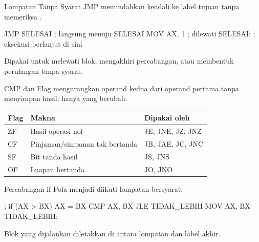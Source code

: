\documentclass[aspectratio=169,11pt]{beamer}
\begin{document}
\begin{frame}[fragile]{Lompatan Tanpa Syarat JMP}
\small
{} memindahkan kendali ke label tujuan tanpa memeriksa
.

\vspace{0.2em}
\begin{kodeasm}[numbers=none]
    JMP SELESAI         ; langsung menuju SELESAI
    MOV AX, 1           ; dilewati
SELESAI:
    ; eksekusi berlanjut di sini
\end{kodeasm}

\vspace{0.15em}
{\footnotesize\color{obeGray}Dipakai untuk melewati blok, mengakhiri
percabangan, atau membentuk perulangan tanpa syarat.\par}
\end{frame}

\begin{frame}{CMP dan Flag}
\footnotesize
{} mengurangkan operand kedua dari operand pertama tanpa
menyimpan hasil; hanya  yang berubah.

\vspace{0.2em}
\begin{center}
\begin{tabular}{@{}>{\raggedright\arraybackslash}p{1.4cm}
    >{\raggedright\arraybackslash}p{5.2cm}
    >{\raggedright\arraybackslash}p{6.2cm}@{}}
    \toprule
    \textbf{Flag} & \textbf{Makna} & \textbf{Dipakai oleh} \\
    \midrule
    ZF & Hasil operasi nol & JE, JNE, JZ, JNZ \\
    \addlinespace
    CF & Pinjaman/simpanan tak bertanda & JB, JAE, JC, JNC \\
    \addlinespace
    SF & Bit tanda hasil & JS, JNS \\
    \addlinespace
    OF & Luapan bertanda & JO, JNO \\
    \bottomrule
\end{tabular}
\end{center}
\end{frame}

\begin{frame}[fragile]{Percabangan if}
\small
Pola  menjadi  diikuti lompatan bersyarat.

\vspace{0.2em}
\begin{kodeasm}[numbers=none]
; if (AX > BX) { AX = BX }
CMP AX, BX
JLE TIDAK_LEBIH
MOV AX, BX
TIDAK_LEBIH:
\end{kodeasm}

\vspace{0.15em}
{\footnotesize\color{obeGray}Blok yang dijalankan diletakkan di antara
lompatan dan label akhir.\par}
\end{frame}
\end{document}
